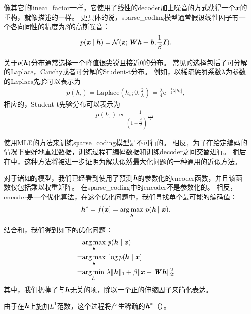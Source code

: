像其它的\gls{linear_factor}一样，它使用了线性的\gls{decoder}加上噪音的方式获得一个$\boldsymbol{\mathit{x}}$的重构，就像描述的一样。
更具体的说，\gls{sparse_coding}模型通常假设线性因子有一个各向同性的精度为$\beta$的高斯噪音：
\begin{align}
\label{eqn:1312}
p(\boldsymbol{\mathit{x}}\mid \boldsymbol{\mathit{h}}) = \mathcal{N}
(\boldsymbol{\mathit{x}};\boldsymbol{\mathit{W}}\boldsymbol{\mathit{h}} + \boldsymbol{\mathit{b}} ,\frac{1}{\beta}\boldsymbol{\mathit{I}}).
\end{align}


关于$p(\boldsymbol{\mathit{h}})$分布通常选择一个峰值很尖锐且接近$0$的分布\citep{Olshausen+Field-1996}。
常见的选择包括了可分解的Laplace，Cauchy或者可分解的Student-t分布。
例如，以稀疏惩罚系数$\lambda$为参数的Laplace先验可以表示为
\begin{align}
\label{eqn:1313}
p(h_i) = \text{Laplace}(h_i;0,\frac{2}{\lambda}) = \frac{\lambda}{4} \text{e}^{ -\frac{1}{2}\lambda \vert h_i\vert},
\end{align}
相应的，Student-t先验分布可以表示为
\begin{align}
\label{eqn:1314}
p(h_i)\propto \frac{1}{(1+\frac{h_i^2}{\nu})^{\frac{\nu+1}{2}}}.
\end{align}

使用\gls{MLE}的方法来训练\gls{sparse_coding}模型是不可行的。
相反，为了在给定编码的情况下更好地重建数据，训练过程在编码数据和训练\gls{decoder}之间交替进行。
稍后在中，这种方法将被进一步证明为解决似然最大化问题的一种通用的近似方法。

对于诸如的模型，我们已经看到使用了预测$\boldsymbol{\mathit{h}}$的参数化的\gls{encoder}函数，并且该函数仅包括乘以权重矩阵。
在\gls{sparse_coding}中的\gls{encoder}不是参数化的。
相反，\gls{encoder}是一个优化算法，在这个优化问题中，我们寻找单个最可能的编码值：
\begin{align}
\label{eqn:1315}
\boldsymbol{\mathit{h}}^* = f(\boldsymbol{\mathit{x}}) = \underset{\boldsymbol{\mathit{h}}}{\arg\max}\  p(\boldsymbol{\mathit{h}}\mid\boldsymbol{\mathit{x}}).
\end{align}


结合和，我们得到如下的优化问题：
\begin{align}
\label{eqn:1316}
& \underset{\boldsymbol{\mathit{h}}}{\arg\max}\  p(\boldsymbol{\mathit{h}}\mid\boldsymbol{\mathit{x}}) \\
= & \underset{\boldsymbol{\mathit{h}}}{\arg\max}\ \log  p(\boldsymbol{\mathit{h}}\mid\boldsymbol{\mathit{x}})\\
= & \underset{\boldsymbol{\mathit{h}}}{\arg\min}\ \lambda \Vert \boldsymbol{\mathit{h}}\Vert_1 + \beta  \Vert \boldsymbol{\mathit{x}} - \boldsymbol{\mathit{W}} \boldsymbol{\mathit{h}}\Vert_2^2,
\end{align}
其中，我们扔掉了与$\boldsymbol{\mathit{h}}$无关的项，除以一个正的伸缩因子来简化表达。

由于在$\boldsymbol{\mathit{h}}$上施加$L^1$范数，这个过程将产生稀疏的$\boldsymbol{\mathit{h}}^*$（）。

